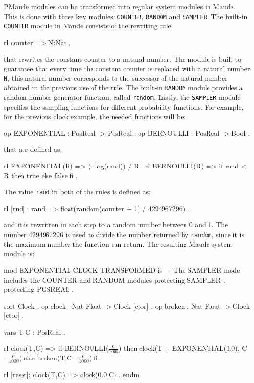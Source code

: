 PMaude modules can be transformed into regular system modules in Maude. This is done with three key modules: \texttt{COUNTER}, \texttt{RANDOM} and \texttt{SAMPLER}. The built-in \texttt{COUNTER} module in Maude consists of the rewriting rule
\\
\begin{maude}
rl counter => N:Nat .
\end{maude}
that rewrites the constant counter to a natural number. The module is built to guarantee that every time the constant counter is replaced with a natural number \texttt{N}, this natural number corresponds to the successor of the natural number obtained in the previous use of the rule. The built-in \texttt{RANDOM} module provides a random number generator function, called \texttt{random}. Lastly, the \texttt{SAMPLER} module specifies the sampling functions for different probability functions. For example, for the previous clock example, the needed functions will be:
\\
\begin{maude}
op EXPONENTIAL : PosReal -> PosReal .
op BERNOULLI : PosReal -> Bool .
\end{maude}
that are defined as:
\\
\begin{maude}
rl EXPONENTIAL(R) => (- log(rand)) / R .
rl BERNOULLI(R) => if rand < R then true else false fi .
\end{maude}
The value \texttt{rand} in both of the rules is defined as:
\\
\begin{maude}
rl [rnd] : rand => float(random(counter + 1) / 4294967296) .
\end{maude}
and it is rewritten in each step to a random number between 0 and 1. The number 4294967296 is used to divide the number returned by \texttt{random}, since it is the maximum number the function can return. The resulting Maude system module \cite{Agha2006} is:
\\
\begin{maude}
mod EXPONENTIAL-CLOCK-TRANSFORMED is 
  --- The SAMPLER mode includes the COUNTER and RANDOM modules
  protecting SAMPLER .
  protecting POSREAL .
  
  sort Clock . 
  op clock : Nat Float -> Clock [ctor] . 
  op broken : Nat Float -> Clock [ctor] . 
  
  vars T C : PosReal . 
  
  rl clock(T,C) => if BERNOULLI($\frac{\text{C}}{1000}$) then 
                        clock(T + EXPONENTIAL(1.0), C - $\frac{\text{C}}{1000}$) 
                   else 
                        broken(T,C - $\frac{\text{C}}{1000}$)
                   fi .
  
  rl [reset]: clock(T,C) => clock(0.0,C) .
endm
\end{maude}

